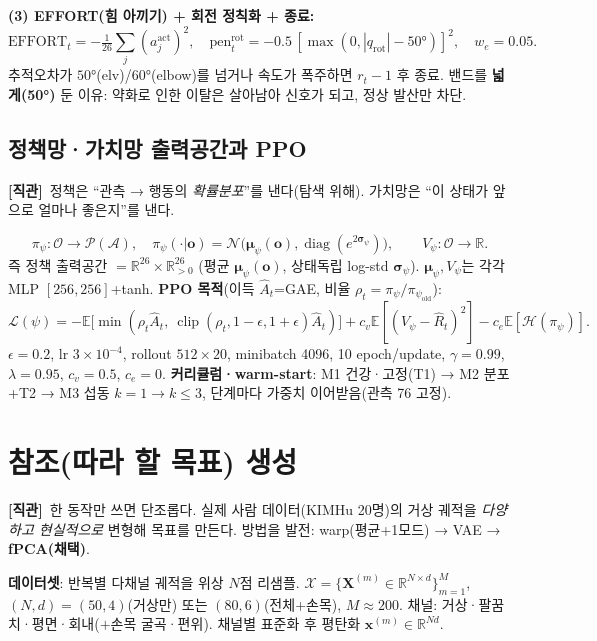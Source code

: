 \documentclass[11pt]{article}
\renewcommand{\vec}[1]{\mathbf{#1}}
\newcommand{\R}{\mathbb{R}}
\newcommand{\Obs}{\mathcal{O}}\newcommand{\Act}{\mathcal{A}}\newcommand{\St}{\mathcal{S}}
\newcommand{\clip}{\operatorname{clip}}\newcommand{\diag}{\operatorname{diag}}
\newcommand{\intuition}[1]{\par\smallskip\noindent\textbf{[직관]}\ #1\par\smallskip}
\begin{document}
\textbf{(3) EFFORT(힘 아끼기) + 회전 정칙화 + 종료:}
\begin{equation}
\mathrm{EFFORT}_t=-\tfrac1{26}\textstyle\sum_j(a^{\mathrm{act}}_j)^2,\quad
\mathrm{pen}^{\mathrm{rot}}_t=-0.5\,[\max(0,|q_{\mathrm{rot}}|-50°)]^2,\quad w_e{=}0.05.
\end{equation}
추적오차가 $50°$(elv)/$60°$(elbow)를 넘거나 속도가 폭주하면 $r_t\!-\!1$ 후 종료. 밴드를 \textbf{넓게(50°)} 둔 이유: 약화로 인한 이탈은 살아남아 신호가 되고, 정상 발산만 차단.

\subsection{정책망·가치망 출력공간과 PPO}
\intuition{정책은 ``관측 → 행동의 \emph{확률분포}''를 낸다(탐색 위해). 가치망은 ``이 상태가 앞으로 얼마나 좋은지''를 낸다.}
\begin{equation}
\pi_\psi:\Obs\to\mathcal P(\Act),\quad \pi_\psi(\cdot|\vec o)=\mathcal N\!\big(\boldsymbol\mu_\psi(\vec o),\diag(e^{2\boldsymbol\sigma_\psi})\big),\qquad V_\psi:\Obs\to\R.
\end{equation}
즉 정책 출력공간 $=\R^{26}\times\R_{>0}^{26}$ (평균 $\boldsymbol\mu_\psi(\vec o)$, 상태독립 log-std $\boldsymbol\sigma_\psi$). $\boldsymbol\mu_\psi,V_\psi$는 각각 MLP $[256,256]$+tanh.
\textbf{PPO 목적}(이득 $\hat A_t$=GAE, 비율 $\rho_t=\pi_\psi/\pi_{\psi_{\mathrm{old}}}$):
\begin{equation}
\mathcal L(\psi)=-\mathbb E\big[\min(\rho_t\hat A_t,\ \clip(\rho_t,1{-}\epsilon,1{+}\epsilon)\hat A_t)\big]+c_v\mathbb E[(V_\psi-\hat R_t)^2]-c_e\mathbb E[\mathcal H(\pi_\psi)].
\end{equation}
$\epsilon{=}0.2$, lr $3{\times}10^{-4}$, rollout $512{\times}20$, minibatch 4096, 10 epoch/update, $\gamma{=}0.99$, $\lambda{=}0.95$, $c_v{=}0.5$, $c_e{=}0$. \textbf{커리큘럼·warm-start}: M1 건강·고정(T1) → M2 분포+T2 → M3 섭동 $k{=}1\!\to\!k{\le}3$, 단계마다 가중치 이어받음(관측 76 고정).

\section{참조(따라 할 목표) 생성}\label{sec:ref}
\intuition{한 동작만 쓰면 단조롭다. 실제 사람 데이터(KIMHu 20명)의 거상 궤적을 \emph{다양하고 현실적으로} 변형해 목표를 만든다. 방법을 발전: warp(평균+1모드) → VAE → \textbf{fPCA(채택)}.}
\textbf{데이터셋}: 반복별 다채널 궤적을 위상 $N$점 리샘플. $\mathcal X=\{\vec X^{(m)}\in\R^{N\times d}\}_{m=1}^{M}$, $(N,d){=}(50,4)$(거상만) 또는 $(80,6)$(전체+손목), $M{\approx}200$. 채널: 거상·팔꿈치·평면·회내($+$손목 굴곡·편위). 채널별 표준화 후 평탄화 $\vec x^{(m)}\in\R^{Nd}$.
\end{document}
